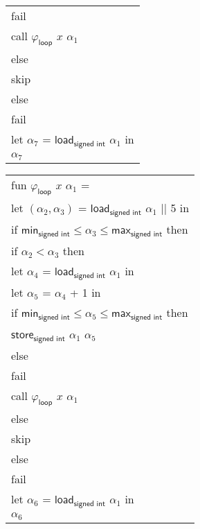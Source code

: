 \documentclass[12pt, a4paper]{article}
\newcommand{\syn}[1]{\textsf{#1}} %
\begin{document}
{\begin{tabular}{l}
{\color{blue} \quad \quad \quad \quad \syn{fail}}\\
{\color{magenta} \quad \quad \quad \syn{call} $\varphi_\syn{loop}$ $x$ $\alpha_1$}\\
{\color{green} \quad \quad \syn{else}}\\
{\color{green} \quad \quad \quad \syn{skip}}\\
{\color{green} \quad \syn{else}}\\
{\color{green} \quad \quad \syn{fail}}\\
{\color{orange} \quad \syn{let} $\alpha_7$ = $\syn{load}_\textsf{signed int}$ $\alpha_1$ \syn{in}}\\
{\color{orange} \quad  $\alpha_7$}
\end{tabular}

\begin{tabular}{l}
\syn{fun} $\varphi_\syn{loop}$ $x$ $\alpha_1$ =\\
{\color{green} \quad \syn{let} $(\alpha_2, \alpha_3)$ = $\syn{load}_\textsf{signed int}$ $\alpha_1$ || 5 \syn{in}}\\
{\color{green} \quad \syn{if} $\syn{min}_\textsf{signed int} \le \alpha_3 \le \syn{max}_\textsf{signed int}$ \syn{then}}\\
{\color{green} \quad \quad \syn{if} $\alpha_2 < \alpha_3$ \syn{then}}\\
{\color{blue} \quad \quad \quad \syn{let} $\alpha_4$ = $\syn{load}_\textsf{signed int}$ $\alpha_1$ \syn{in}}\\
{\color{blue} \quad \quad \quad \syn{let} $\alpha_5$ = $\alpha_4$ + 1 \syn{in}}\\
{\color{blue} \quad \quad \quad \syn{if} $\syn{min}_\textsf{signed int} \le \alpha_5 \le \syn{max}_\textsf{signed int}$ \syn{then}}\\
{\color{blue} \quad \quad \quad \quad $\syn{store}_\textsf{signed int}$ $\alpha_1$ $\alpha_5$}\\
{\color{blue} \quad \quad \quad  \syn{else}}\\
{\color{blue} \quad \quad \quad \quad \syn{fail}}\\
{\color{magenta} \quad \quad \quad \syn{call} $\varphi_\syn{loop}$ $x$ $\alpha_1$}\\
{\color{green} \quad \quad \syn{else}}\\
{\color{green} \quad \quad \quad \syn{skip}}\\
{\color{green} \quad \syn{else}}\\
{\color{green} \quad \quad \syn{fail}}\\
{\color{orange} \quad \syn{let} $\alpha_6$ = $\syn{load}_\textsf{signed int}$ $\alpha_1$ \syn{in}}\\
{\color{orange} \quad  $\alpha_6$}
\end{tabular}
}
\end{document}
